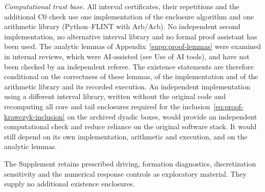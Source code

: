 \documentclass[a4paper,11pt]{article}
\begin{document}
\emph{Computational trust base.} All interval certificates, their
repetitions and the additional C0 check use one implementation of the
enclosure algorithm and one arithmetic library (Python--FLINT with
Arb/Acb). No independent second implementation, no alternative interval
library and no formal proof assistant has been used. The analytic lemmas
of Appendix~\ref{supp:proof-lemmas} were examined in internal reviews,
which were AI-assisted (see Use of AI tools), and have not been checked
by an independent referee. The existence statements are therefore
conditional on the correctness of these lemmas, of the implementation
and of the arithmetic library and its recorded execution. An
independent implementation using a different interval library, written
without the original code and recomputing all core and tail enclosures
required for the inclusion~\eqref{eq:proof-krawczyk-inclusion} on the
archived dyadic boxes, would provide an independent computational check
and reduce reliance on the original software stack. It would still
depend on its own implementation, arithmetic and execution, and on the
analytic lemmas.

The Supplement retains prescribed driving, formation diagnostics,
discretization sensitivity and the numerical response controls as
exploratory material. They supply no additional existence enclosures.
\end{document}
